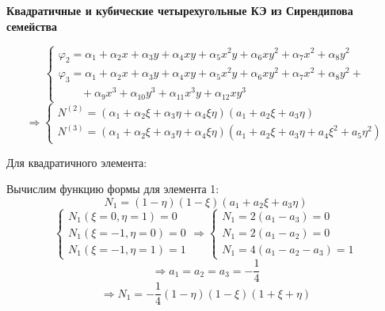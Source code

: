\begin{center}
	\textbf{Квадратичные и кубические четырехугольные КЭ из Сирендипова семейства}
\end{center}
\[
\begin{cases}
\varphi_2=\alpha_1+\alpha_2x+\alpha_3y+\alpha_4xy+\alpha_5x^2y+\alpha_6xy^2+\alpha_7x^2+\alpha_8y^2 \\
\varphi_3= \alpha_1+\alpha_2x+\alpha_3y+\alpha_4xy+\alpha_5x^2y+\alpha_6xy^2+\alpha_7x^2+\alpha_8y^2 + \\
\qquad +\alpha_9x^3+\alpha_{10}y^3+\alpha_{11}x^3y+\alpha_{12}xy^3
\end{cases}
\]
\[
\Rightarrow
\begin{cases}
	N^{(2)}=(\alpha_1+\alpha_2\xi+\alpha_3\eta+\alpha_4\xi\eta)(a_1+a_2\xi+a_3\eta) \\
	N^{(3)}=(\alpha_1+\alpha_2\xi+\alpha_3\eta+\alpha_4\xi\eta)(a_1+a_2\xi+a_3\eta+a_4\xi^2+a_5\eta^2)
\end{cases}
\]

Для квадратичного элемента:

\begin{center}
\end{center}

Вычислим функцию формы для элемента 1:
\[
	N_1=(1-\eta)(1-\xi)(a_1+a_2\xi+a_3\eta) 
\]
\[ \begin{cases}
	N_1(\xi=0, \eta=1)=0 \\
	N_1(\xi=-1, \eta=0) =0 \\
	N_1(\xi=-1, \eta=1) = 1 \end{cases} \Rightarrow \begin{cases} N_1=2(a_1-a_3)=0 \\ N_1=2(a_1-a_2)=0 \\ N_1 = 4(a_1-a_2-a_3)=1  \end{cases}
\]
\[
\Rightarrow a_1=a_2=a_3=-\frac{1}{4} 
\]
\[
	\Rightarrow N_1=-\frac{1}{4}(1-\eta)(1-\xi)(1+\xi+\eta) 
\]

